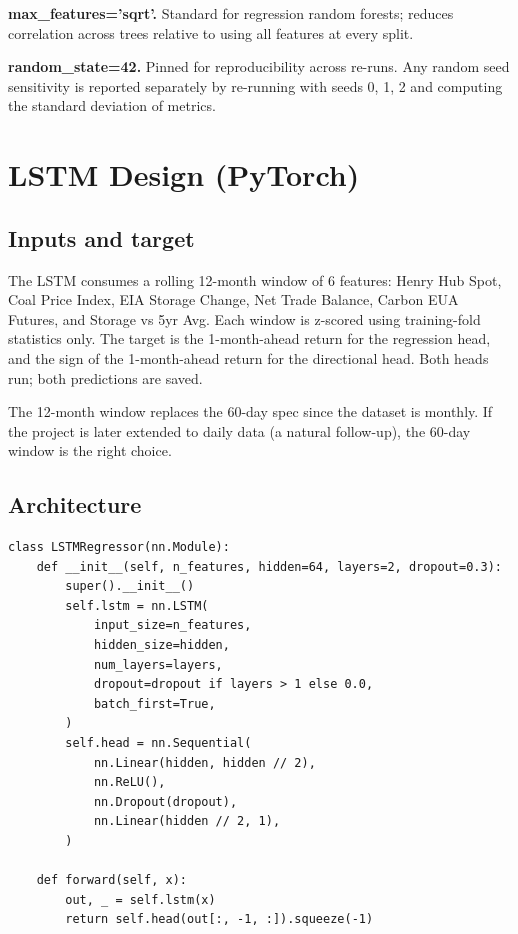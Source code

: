 \documentclass[11pt,letterpaper]{article}
\begin{document}
\textbf{max\_features='sqrt'.} Standard for regression random forests; reduces correlation across trees relative to using all features at every split.

\textbf{random\_state=42.} Pinned for reproducibility across re-runs. Any random seed sensitivity is reported separately by re-running with seeds 0, 1, 2 and computing the standard deviation of metrics.

\section{LSTM Design (PyTorch)}

\subsection{Inputs and target}

The LSTM consumes a rolling 12-month window of 6 features: Henry Hub Spot, Coal Price Index, EIA Storage Change, Net Trade Balance, Carbon EUA Futures, and Storage vs 5yr Avg. Each window is z-scored using training-fold statistics only. The target is the 1-month-ahead return for the regression head, and the sign of the 1-month-ahead return for the directional head. Both heads run; both predictions are saved.

The 12-month window replaces the 60-day spec since the dataset is monthly. If the project is later extended to daily data (a natural follow-up), the 60-day window is the right choice.

\subsection{Architecture}

\begin{lstlisting}
class LSTMRegressor(nn.Module):
    def __init__(self, n_features, hidden=64, layers=2, dropout=0.3):
        super().__init__()
        self.lstm = nn.LSTM(
            input_size=n_features,
            hidden_size=hidden,
            num_layers=layers,
            dropout=dropout if layers > 1 else 0.0,
            batch_first=True,
        )
        self.head = nn.Sequential(
            nn.Linear(hidden, hidden // 2),
            nn.ReLU(),
            nn.Dropout(dropout),
            nn.Linear(hidden // 2, 1),
        )

    def forward(self, x):
        out, _ = self.lstm(x)
        return self.head(out[:, -1, :]).squeeze(-1)
\end{lstlisting}
\end{document}
